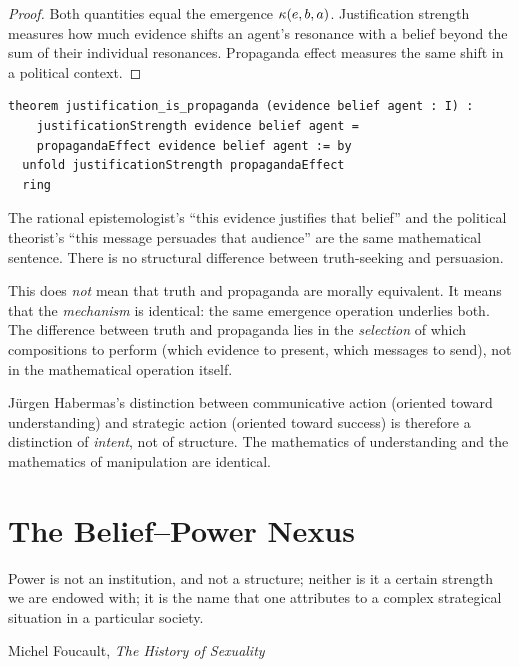 \begin{proof}
Both quantities equal the emergence $\kappa(e, b, a)$.  Justification strength measures how much evidence shifts an agent's resonance with a belief beyond the sum of their individual resonances.  Propaganda effect measures the same shift in a political context.
\end{proof}

\begin{lstlisting}
theorem justification_is_propaganda (evidence belief agent : I) :
    justificationStrength evidence belief agent =
    propagandaEffect evidence belief agent := by
  unfold justificationStrength propagandaEffect
  ring
\end{lstlisting}

\begin{paradox}
The rational epistemologist's ``this evidence justifies that belief'' and the political theorist's ``this message persuades that audience'' are the same mathematical sentence.  There is no structural difference between truth-seeking and persuasion.

This does \emph{not} mean that truth and propaganda are morally equivalent.  It means that the \emph{mechanism} is identical: the same emergence operation underlies both.  The difference between truth and propaganda lies in the \emph{selection} of which compositions to perform (which evidence to present, which messages to send), not in the mathematical operation itself.

J\"urgen Habermas's distinction between communicative action (oriented toward understanding) and strategic action (oriented toward success) is therefore a distinction of \emph{intent}, not of structure.  The mathematics of understanding and the mathematics of manipulation are identical.
\end{paradox}


\chapter{The Belief--Power Nexus}

\epigraph{Power is not an institution, and not a structure; neither is it a certain strength we are endowed with; it is the name that one attributes to a complex strategical situation in a particular society.}{Michel Foucault, \textit{The History of Sexuality}}

